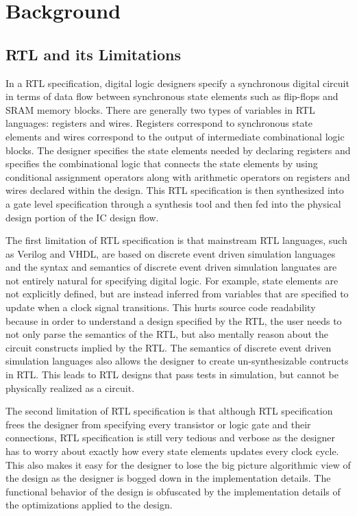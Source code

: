 \section{Background}
\subsection{RTL and its Limitations}
\label{section:RTLCons}
In a RTL specification, digital logic designers specify a synchronous digital circuit in terms of data flow between synchronous state elements such as flip-flops and SRAM memory blocks. There are generally two types of variables in RTL languages: registers and wires. Registers correspond to synchronous state elements and wires correspond to the output of intermediate combinational logic blocks. The designer specifies the state elements needed by declaring registers and specifies the combinational logic that connects the state elements by using conditional assignment operators along with arithmetic operators on registers and wires declared within the design. This RTL specification is then synthesized into a gate level specification through a synthesis tool and then fed into the physical design portion of the IC design flow. 

The first limitation of RTL specification is that mainstream RTL languages, such as Verilog and VHDL, are based on discrete event driven simulation languages and the syntax and semantics of discrete event driven simulation languates are not entirely natural for specifying digital logic. For example, state elements are not explicitly defined, but are instead inferred from variables that are specified to update when a clock signal transitions. This hurts source code readability because in order to understand a design specified by the RTL, the user needs to not only parse the semantics of the RTL, but also mentally reason about the circuit constructs implied by the RTL. The semantics of discrete event driven simulation languages also allows the designer to create un-synthesizable contructs in RTL. This leads to RTL designs that pass tests in simulation, but cannot be physically realized as a circuit.

The second limitation of RTL specification is that although RTL specification frees the designer from specifying every transistor or logic gate and their connections, RTL specification is still very tedious and verbose as the designer has to worry about exactly how every state elements updates every clock cycle. This also makes it easy for the designer to lose the big picture algorithmic view of the design as the designer is bogged down in the implementation details. The functional behavior of the design is obfuscated by the implementation details of the optimizations applied to the design.

